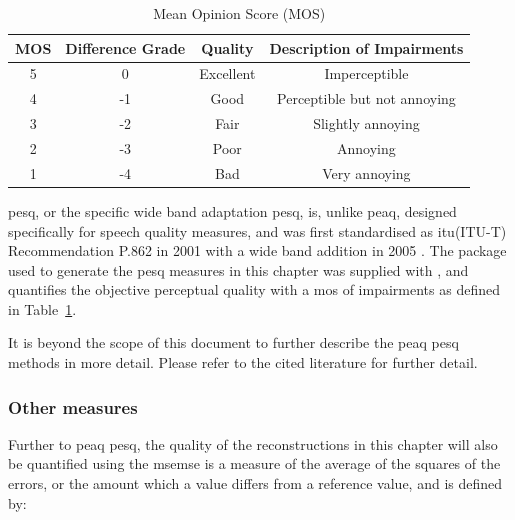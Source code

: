 \begin{table}\begin{center}
\caption{Mean Opinion Score (MOS)}
\label{tab:MOS}
\begin{tabular}{|c|c|c|c|}\hline
MOS & Difference Grade  & Quality       & Description of Impairments  \\ \hline
5   & 0                 & Excellent     & Imperceptible               \\
4   & -1                & Good          & Perceptible but not annoying\\
3   & -2                & Fair          & Slightly annoying           \\
2   & -3                & Poor          & Annoying                    \\
1   & -4                & Bad           & Very annoying               \\ \hline
\end{tabular}\end{center}\end{table}

\DIFdelbegin {}\DIFdelend \DIFaddbegin \gls{pesq}\DIFaddend , or the specific wide band adaptation \DIFdelbegin {}\DIFdelend \DIFaddbegin \gls{pesq}\DIFaddend \cite{P862-2-2005}, is, unlike \DIFdelbegin {}\DIFdelend \DIFaddbegin \gls{peaq}\DIFaddend , designed specifically for speech quality measures, and was first standardised as \DIFdelbegin {}\DIFdelend \DIFaddbegin \gls{itu}\DIFaddend (ITU-T) Recommendation P.862 in 2001 with a wide band addition in 2005 \cite{P862-2-2005}. The package used to generate the \DIFdelbegin {}\DIFdelend \DIFaddbegin \gls{pesq} \DIFaddend measures in this chapter was supplied with \cite{Loizou2007}, and quantifies the objective perceptual quality with a \DIFdelbegin {}\DIFdelend \DIFaddbegin \gls{mos} \DIFaddend of impairments as defined in Table~\ref{tab:MOS}.

It is beyond the scope of this document to further describe the \DIFdelbegin {}\DIFdelend \DIFaddbegin \gls{peaq} \gls{pesq} \DIFaddend methods in more detail. Please refer to the cited literature for further detail.

\subsubsection{Other measures}
Further to \DIFdelbegin {}\DIFdelend \DIFaddbegin \gls{peaq} \gls{pesq}\DIFaddend , the quality of the reconstructions in this chapter will also be quantified using the \DIFdelbegin {}\DIFdelend \DIFaddbegin \gls{mse}\gls{mse} \DIFaddend is a measure of the average of the squares of the errors, or the amount which a value differs from a reference value, and is defined by:

